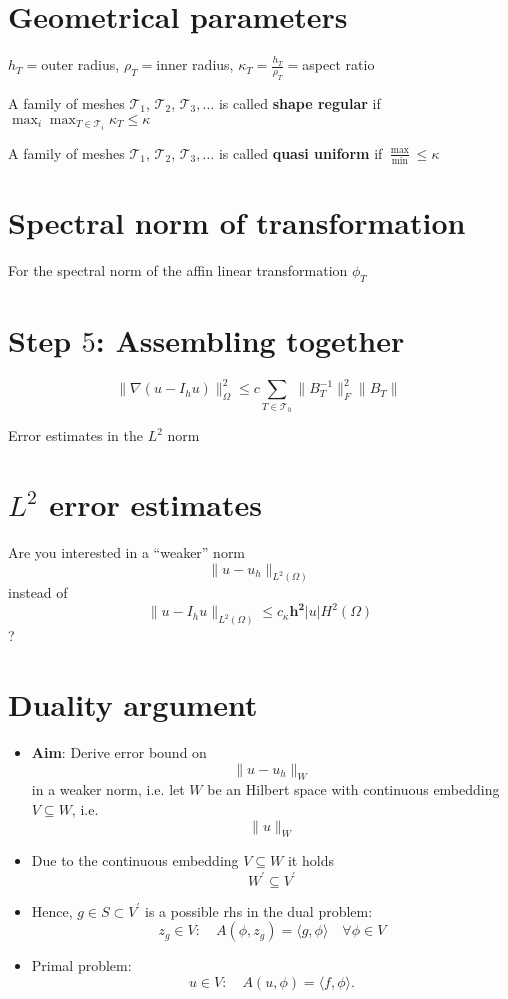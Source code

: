 \documentclass[openany,a4paper,11pt]{memoir}
\theoremstyle{definition}
\begin{document}
\section{Geometrical parameters}

$h_T=$outer radius, $\rho_T=$inner radius, $\kappa_T=\frac{h_T}{\rho_T}=$aspect ratio

A family of meshes $\mathcal{T}_1$, $\mathcal{T}_2$, $\mathcal{T}_3,\ldots$ is called \textbf{shape regular} if $\max_{i}\max_{T\in\mathcal{T}_i}\kappa_T\le \kappa$

A family of meshes $\mathcal{T}_1$, $\mathcal{T}_2$, $\mathcal{T}_3,\ldots$ is called \textbf{quasi uniform} if $\frac{\max}{\min}\le \kappa$

\section{Spectral norm of transformation}

For the spectral norm of the affin linear transformation $\phi_T$

\section{Step $5$: Assembling together}

\[ \|\nabla(u-I_h u)\|^2_{\Omega}\le c\sum_{T\in\mathcal{T}_h}\|B_T ^{-1}\|^2_{F}\|B_T\|\ \]

Error estimates in the $L^2$ norm

\section{$L^2$ error estimates}

Are you interested in a ``weaker'' norm \[ \|u-u_h\|_{L^2(\Omega)} \] instead of \[ \|u-I_h u\|_{L^2(\Omega)}\le c_{\kappa}\bm{h^2}|u|H^2(\Omega)  \] ?

\section{Duality argument}
\begin{itemize}
\item \textbf{Aim}: Derive error bound on \[\|u-u_h\|_{W} \] in a weaker norm, i.e. let $W$ be an Hilbert space with continuous embedding $V\subseteq W$, i.e. \[\|u\|_{W} \]
\end{itemize}


\begin{itemize}
\item Due to the continuous embedding $V\subseteq W$ it holds \[ W^{\prime}\subseteq V^\prime \]
  
\item Hence, $g\in S\subset V^\prime$ is a possible rhs in the dual problem:
  \[ z_g\in V\colon\quad A(\phi, z_g)=\langle g,\phi\rangle\quad\forall \phi\in V \]
 
\item Primal problem: \[ u\in V\colon\quad A(u,\phi)=\langle f,\phi\rangle. \]
\end{itemize}
\end{document}
